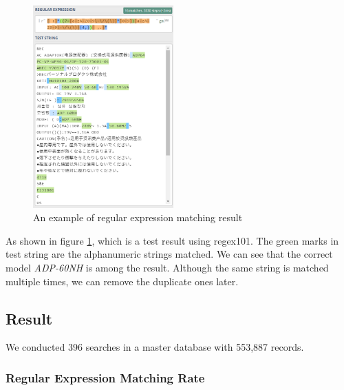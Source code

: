 \documentclass[technicalreport]{ieicej}
\begin{document}
        \begin{figure}[t] 
            \begin{center}
            \includegraphics[width=0.48\textwidth]{figure/result-regex.png}
            \end{center}
            \caption{An example of regular expression matching result}
            \label{fig:result-regex}
        \end{figure}

        As shown in figure \ref{fig:result-regex}, which is a test result using regex101\cite{regex101}. The green marks in test string are the alphanumeric strings matched. We can see that the correct model {\em ADP-60NH} is among the result. Although the same string is matched multiple times, we can remove the duplicate ones later.

    \subsection{Result}
            
        We conducted 396 searches in a master database with 553,887 records.

        \subsubsection{Regular Expression Matching Rate}
\end{document}
